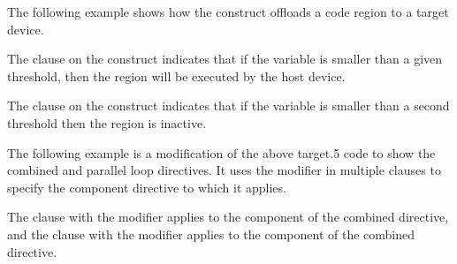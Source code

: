 The following example shows how the  construct offloads a code region 
to a target device.

The  clause on the  construct indicates that if the variable 
 is smaller than a given threshold, then the  region will be executed 
by the host device.

The  clause on the  construct indicates that if the 
variable  is smaller than a second threshold then the  region 
is inactive.



The following example is a modification of the above target.5 code to show the combined 
and parallel loop directives. It uses the  modifier in multiple 
clauses to specify the component directive to which it applies. 

The  clause with the  modifier applies to the  component of the 
combined directive, and the  clause with the  modifier applies 
to the  component of the combined directive.    



